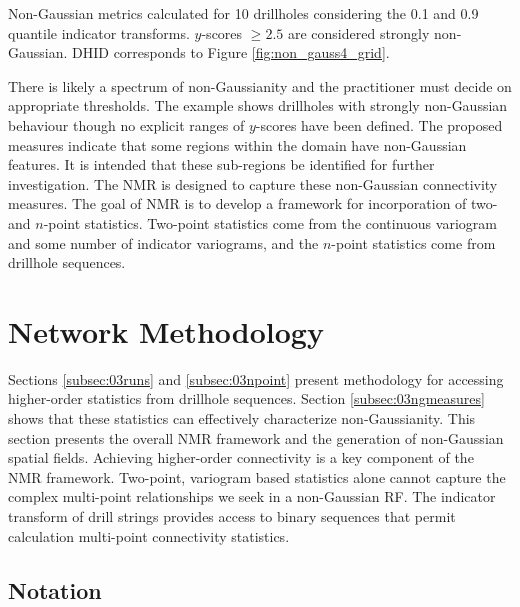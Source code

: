 \begin{table}[!htb]
    \centering
    \caption{Non-Gaussian metrics calculated for 10 drillholes considering the 0.1 and 0.9 quantile indicator transforms. $y$-scores $\geq 2.5$ are considered strongly non-Gaussian. DHID corresponds to Figure \ref{fig:non_gauss4_grid}.}
    \resizebox{1\width}{!}{}
    \label{tab:ng_metrics}
\end{table}

There is likely a spectrum of non-Gaussianity and the practitioner must decide on appropriate thresholds. The example shows drillholes with strongly non-Gaussian behaviour though no explicit ranges of $y$-scores have been defined. The proposed measures indicate that some regions within the domain have non-Gaussian features. It is intended that these sub-regions be identified for further investigation. The \gls{NMR} is designed to capture these non-Gaussian connectivity measures. The goal of \gls{NMR} is to develop a framework for incorporation of two- and $n$-point statistics. Two-point statistics come from the continuous variogram and some number of indicator variograms, and the $n$-point statistics come from drillhole sequences.


\FloatBarrier
\section{Network Methodology}
\label{sec:method}

Sections \ref{subsec:03runs} and \ref{subsec:03npoint} present methodology for accessing higher-order statistics from drillhole sequences. Section \ref{subsec:03ngmeasures} shows that these statistics can effectively characterize non-Gaussianity. This section presents the overall \gls{NMR} framework and the generation of non-Gaussian spatial fields. Achieving higher-order connectivity is a key component of the \gls{NMR} framework. Two-point, variogram based statistics alone cannot capture the complex multi-point relationships we seek in a non-Gaussian \gls{RF}. The indicator transform of drill strings provides access to binary sequences that permit calculation multi-point connectivity statistics.


\FloatBarrier
\subsection{Notation}
\label{subsec:03notation}

